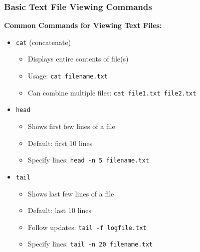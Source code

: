 \documentclass[10pt]{beamer}
\begin{document}
\begin{frame}[fragile]
    \frametitle{Basic Text File Viewing Commands}
    
    \textbf{Common Commands for Viewing Text Files:}
    \begin{itemize}
        \item \colorbox{gray!20}{\texttt{cat}} (concatenate)
        \begin{itemize}
            \item Displays entire contents of file(s)
            \item Usage: \texttt{cat filename.txt}
            \item Can combine multiple files: \texttt{cat file1.txt file2.txt}
        \end{itemize}
        
        \item \colorbox{gray!20}{\texttt{head}} 
        \begin{itemize}
            \item Shows first few lines of a file
            \item Default: first 10 lines
            \item Specify lines: \texttt{head -n 5 filename.txt}
        \end{itemize}
        
        \item \colorbox{gray!20}{\texttt{tail}}
        \begin{itemize}
            \item Shows last few lines of a file
            \item Default: last 10 lines
            \item Follow updates: \texttt{tail -f logfile.txt}
            \item Specify lines: \texttt{tail -n 20 filename.txt}
        \end{itemize}
    \end{itemize}
\end{frame}
\end{document}

